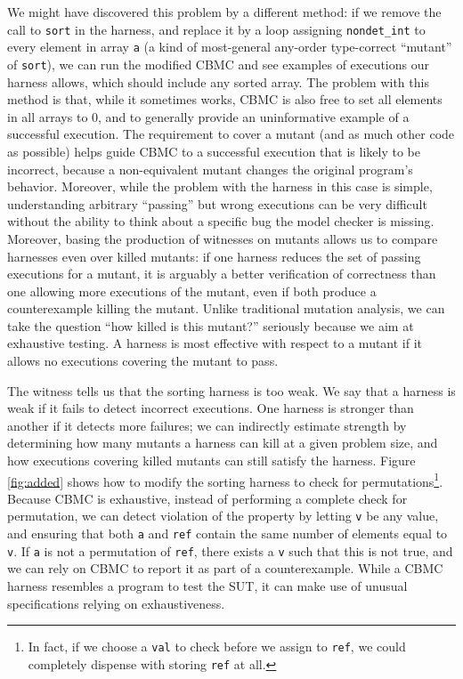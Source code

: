 \documentclass{svjour3}
\begin{document}
We might have discovered this problem by a different method: if we
remove the call to {\tt sort} in the harness, and replace it by a loop
assigning {\tt nondet\_int} to every element in array {\tt a} (a kind of
most-general any-order type-correct ``mutant'' of {\tt sort}), we can run
the modified CBMC and see examples of executions our harness allows,
which should include any sorted array.  The problem with this
method is that, while it sometimes works, CBMC is also free to
set all elements in all arrays to 0, and to generally provide an
uninformative example of a successful execution.  The requirement to
cover a mutant (and as much other code as possible) helps guide CBMC
to a successful execution that is likely to be incorrect,
because a non-equivalent mutant changes the original program's behavior.  Moreover, while the
problem with the harness in this case is simple, understanding
arbitrary ``passing'' but wrong executions can be very difficult
without the ability to think about a specific bug the model
checker is missing.  Moreover, basing the production of witnesses on
mutants allows us to compare harnesses even over killed mutants:  if
one harness reduces the set of passing executions for a mutant, it is
arguably a better verification of correctness than one allowing more
executions of the mutant, even if both produce a counterexample
killing the mutant.  Unlike traditional mutation analysis, we can take
the question ``how killed is this mutant?'' seriously because we aim at
exhaustive testing.  A harness is most effective with respect to a
mutant if it allows no executions covering the mutant to pass.

The witness tells us that the sorting harness is too weak.  We
say that a harness is weak if it fails to detect incorrect executions.
One harness is stronger than another if it detects more failures; we
can indirectly estimate strength by determining how many mutants a
harness can kill at a given problem size, and how executions covering
killed mutants can still satisfy the harness.  Figure \ref{fig:added}
shows how to modify the sorting harness to check for permutations\footnote{In fact, if we choose a {\tt val} to check
  before we assign to {\tt ref}, we
  could completely dispense with storing {\tt ref} at all.}.  Because CBMC is exhaustive,
instead of performing a complete check for permutation, we can detect
violation of the property by letting {\tt v} be any value, and
ensuring that both {\tt a} and {\tt ref} contain the same
number of elements equal to {\tt v}.  If {\tt a} is not
a permutation of {\tt ref}, there exists a {\tt v} such that this is not
true, and we can rely on CBMC to report it as part of a
counterexample.  While a CBMC harness
resembles a program to test the SUT, it can make use of unusual specifications
relying on exhaustiveness.
\end{document}
